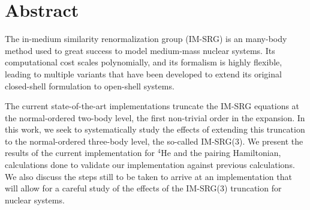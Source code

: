 \chapter*{Abstract}

The in-medium similarity renormalization group (IM-SRG)
is an \abinitio{} many-body method used to great success
to model medium-mass nuclear systems.
Its computational cost scales polynomially,
and its formalism is highly flexible,
leading to multiple variants that have been developed to extend its original closed-shell
formulation to open-shell systems.

The current state-of-the-art implementations truncate the IM-SRG equations
at the normal-ordered two-body level,
the first non-trivial order in the expansion.
In this work, we seek to systematically study the effects
of extending this truncation to the normal-ordered three-body level,
the so-called IM-SRG(3).
We present the results of the current implementation
for ${}^4\text{He}$ and the pairing Hamiltonian,
calculations done to validate our implementation against previous calculations.
We also discuss the steps still to be taken to
arrive at an implementation that will allow for a careful study of the effects
of the IM-SRG(3) truncation for nuclear systems.
